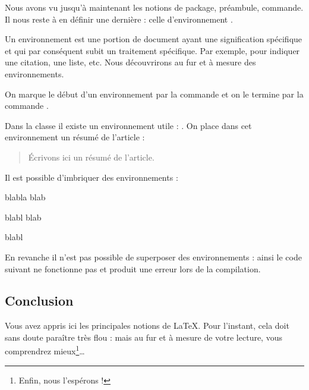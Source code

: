 Nous avons vu jusqu'à maintenant les notions de  package, préambule, commande. 
Il nous reste à en définir une dernière  : celle d'environnement .

Un environnement  est une portion de document ayant une signification spécifique et qui par conséquent subit un traitement spécifique. Par exemple, pour indiquer une citation, une liste, etc. Nous découvrirons au fur et à mesure  des environnements. 


On marque le début d'un environnement   par la commande  et on le termine par la commande .




Dans la classe  il existe un environnement utile : . On place dans cet environnement un résumé de l'article :

\begin{latexcode}
\begin{abstract}
Écrivons ici un résumé de l'article. 
\end{abstract}
\end{latexcode}


Il est possible d'imbriquer des environnements :

\begin{latexcode}
\begin{1}
blabla blab
\begin{2}
blabl blab
\end{2}
blabl
\end{1}
\end{latexcode}


En revanche il n'est pas possible de superposer des environnements : ainsi le code suivant ne fonctionne pas et produit une erreur lors de la compilation.



\subsection{Conclusion}

Vous avez appris ici les principales notions de \LaTeX. Pour l'instant, cela doit sans doute paraître très flou : mais au fur et à mesure de votre lecture, vous comprendrez mieux\footnote{Enfin, nous l'espérons !}\ldots


